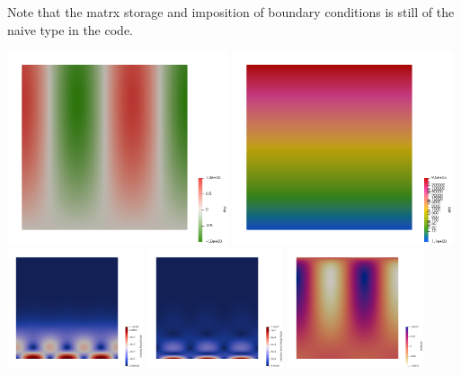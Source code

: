 Note that the matrx storage and imposition of boundary conditions is still 
of the naive type in the code. 

\begin{center}
\includegraphics[width=6.5cm]{python_codes/fieldstone_06/results/rho}
\includegraphics[width=6.5cm]{python_codes/fieldstone_06/results/eta}\\
\includegraphics[width=4cm]{python_codes/fieldstone_06/results/vel}
\includegraphics[width=4cm]{python_codes/fieldstone_06/results/vel_error}
\includegraphics[width=4cm]{python_codes/fieldstone_06/results/press}

\end{center}

